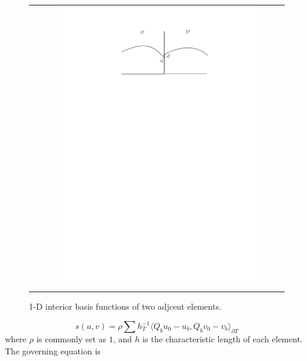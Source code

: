 \begin{figure}[h]
	\centering
	\begin{tabular}{c}
		\includegraphics[width=0.8\textwidth]{./pics/stabilizer.pdf}
	\end{tabular}
	\caption{\footnotesize 1-D interior basis functions of two adjcent elements.}\label{fig1: stabilierFig}
\end{figure}


\begin{equation}
s(u, v) = \rho \sum h_{T}^{-1} \langle Q_{b} u_{0} - u_{b}, Q_{b} v_{0} - v_{b} \rangle_{\partial T}
\end{equation}
where $ \rho $ is commonly set as $ 1 $, and $ h $ is the characteristic length of each element. The governing equation is 

